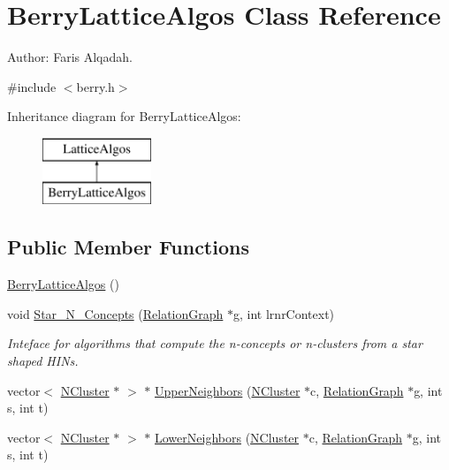 \hypertarget{class_berry_lattice_algos}{
\section{BerryLatticeAlgos Class Reference}
\label{class_berry_lattice_algos}
}


Author: Faris Alqadah.  




{\ttfamily \#include $<$berry.h$>$}

Inheritance diagram for BerryLatticeAlgos:\begin{figure}[H]
\begin{center}
\leavevmode
\includegraphics[height=2.000000cm]{class_berry_lattice_algos}
\end{center}
\end{figure}
\subsection*{Public Member Functions}
\begin{DoxyCompactItemize}
\item 
\hyperlink{class_berry_lattice_algos_a02d8e6dd215d9925422adff01208a06c}{BerryLatticeAlgos} ()
\item 
void \hyperlink{class_berry_lattice_algos_aa740db0f43531fc872f94c062efe59b9}{Star\_\-N\_\-Concepts} (\hyperlink{class_relation_graph}{RelationGraph} $\ast$g, int lrnrContext)
\begin{DoxyCompactList}\small\item\em Inteface for algorithms that compute the n-\/concepts or n-\/clusters from a star shaped HINs. \item\end{DoxyCompactList}\item 
vector$<$ \hyperlink{class_n_cluster}{NCluster} $\ast$ $>$ $\ast$ \hyperlink{class_berry_lattice_algos_a22c1daa784e7bf5017a40b313fcec221}{UpperNeighbors} (\hyperlink{class_n_cluster}{NCluster} $\ast$c, \hyperlink{class_relation_graph}{RelationGraph} $\ast$g, int s, int t)
\item 
vector$<$ \hyperlink{class_n_cluster}{NCluster} $\ast$ $>$ $\ast$ \hyperlink{class_berry_lattice_algos_af33af014732c42bf75864cb492184104}{LowerNeighbors} (\hyperlink{class_n_cluster}{NCluster} $\ast$c, \hyperlink{class_relation_graph}{RelationGraph} $\ast$g, int s, int t)
\end{DoxyCompactItemize}
